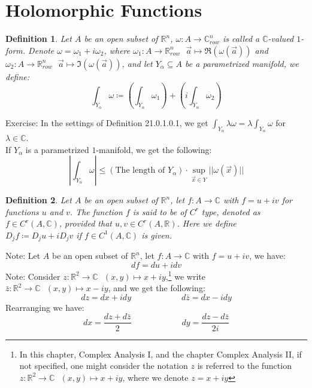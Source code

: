 \documentclass[15pt]{book}
\theoremstyle{break}
\theoremstyle{break}
\newtheorem{defn}{Definition}[corL]
\newcommand{\R}{\mathbb{R}}
\newcommand{\Complex}{\mathbb{C}}
\newcommand{\note}{\color{red}Note: \color{black}}
\newcommand{\exercise}{\color{green}Exercise: \color{black}}
\begin{document}
\newpage
\section[Holomorphic Functions]{\color{red}Holomorphic Functions\color{black}}
\begin{defn}
Let $A$ be an open subset of $\R^n$, $\omega:A \to \Complex^n_{row}$ is called a $\Complex$-valued $1$-form. Denote $\omega = \omega_1 + i \omega_2$,  where $\omega_1: A \to \R^n_{row} \ \ \ \vec{a}\mapsto \Re(\omega(\vec{a}))$ and $\omega_2:A \to \R^n_{row}\ \ \ \vec{a}\mapsto \Im(\omega(\vec{a}))$, and let $Y_\alpha \subseteq A$ be a parametrized manifold, we define: 
$$\int_{Y_\alpha} \omega \coloneqq \left(\int_{Y_\alpha} \omega_1 \right)+\left( i\int_{Y_\alpha} \omega_2\right)$$
\end{defn}

\exercise In the settings of Definition 21.0.1.0.1, we get $\int_{Y_\alpha} \lambda \omega = \lambda \int_{Y_\alpha} \omega$ for $\lambda \in \Complex$. \\
If $Y_\alpha$ is a parametrized $1$-manifold, we get the following:
$$\left| \int_{Y_\alpha}  \omega \right| \leq (\text{The length of }Y_\alpha) \cdot \sup_{\vec{x}\in Y} ||\omega (\vec{x})||$$


\begin{defn}
Let $A$ be an open subset of $\R^n$, let $f:A \to \Complex$ with $f = u+iv$ for functions $u$ and $v$. The function $f$ is said to be of $C^r$ type, denoted as $f \in C^r(A,\Complex)$, provided that $u,v \in C^r(A,\R)$. Here we define $D_j f \coloneqq D_j u + i D_j v$ if $f \in C^1(A,\Complex)$ is given. 
\end{defn}


\note Let $A$ be an open subset of $\R^n$, let $f:A \to \Complex$ with $f=u+iv$, we have: $$df = du + i dv$$ 
\note Consider $z:\R^2 \to \Complex \ \ \ (x,y)\mapsto x+iy$,\footnote{In this chapter, Complex Analysis I, and the chapter Complex Analysis II, if not specified, one might consider the notation $z$ is referred to the function $z:\R^2 \to \Complex \ \ \ (x,y)\mapsto x+iy$, where we denote $z = x+iy$} we write $\bar{z}:\R^2 \to \Complex \ \ \ (x,y) \mapsto x-iy$, and we get the following:
$$dz = dx+idy \qquad\qquad\qquad d\bar{z} = dx - i dy$$ 
Rearranging we have:
$$dx = \frac{dz+d\bar{z}}{2}\qquad\qquad\qquad dy = \frac{dz-d\bar{z}}{2i}$$
\end{document}

